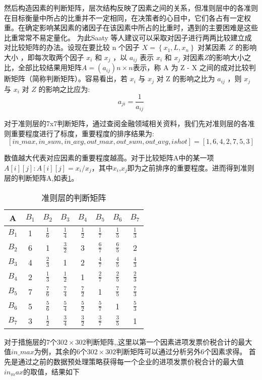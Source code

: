 \documentclass{cumcmthesis}
\begin{document}
然后构造因素的判断矩阵，层次结构反映了因素之间的关系，但准则层中的各准则在目标衡量中所占的比重并不一定相同，在决策者的心目中，它们各占有一定权重。在确定影响某因素的诸因子在该因素中所占的比重时，遇到的主要困难是这些比重常常不易定量化。 为此Saaty 等人建议可以采取对因子进行两两比较建立成对比较矩阵的办法。设现在要比较 n 个因子 $X = \left\{ x_1,L, x_n \right\} $ 对某因素 $Z$ 的影响大小 ，即每次取两个因子 $x_i$ 和 $x_j$ ，以 $a_{ij}$ 表示 $x_i$ 和 $x_j$ 对因素$Z$的影响大小之比，全部比较结果用矩阵$A = (a_{ij} )n \times n $表示，称 A 为 Z - X 之间的成对比较判断矩阵（简称判断矩阵）。容易看出，若 $x_i$ 与 $x_j$ 对 Z 的影响之比为 $a_{ij}$ ，则 $x_j$ 与 $x_i$ 对 $Z$ 的影响之比应为:
\begin{equation}
    a_{ji} = \frac{1}{a_{ij}}
\end{equation}

对于准则层的7x7判断矩阵，通过查阅金融领域相关资料，我们先对准则层的各准则重要程度进行了标度，重要程度的排序结果为:$$\left[ in\_max,in\_sum,in\_avg,out\_max,out\_sum,out\_avg,ishot\right]=[1,6,4,2,7,5,3]$$

数值越大代表对应因素的重要程度越高。对于比较矩阵A中的某一项$A\left[i\right]\left[j\right]:A\left[i\right]\left[j\right]=x_i/x_j$，其中$x_i$,$x_j$即为之前排序的重要程度。进而得到准则层的判断矩阵A,如表\ref{tablejudge}。

\begin{table}[H]
    \centering
    \begin{tabular}{|c|ccccccc|}%
    \hline
        A & $B_1$ & $B_2$ & $B_3$ & $B_4$ & $B_5$ & $B_6$ & $B_7$   \\
    \hline 
    $B_1$  &  1   &$\frac{1}{6}$  &$\frac{1}{4}$  &$\frac{1}{2}$  &$\frac{1}{7}$  &$\frac{1}{5}$  &$\frac{1}{3}$\\
    $B_2$  &  6   &1              &$\frac{3}{2}$  &3              &$\frac{6}{7}$  &$\frac{6}{5}$  &2\\
    $B_3$  &  4   &$\frac{2}{3}$  &1              &2              &$\frac{4}{7}$  &$\frac{4}{5}$  &$\frac{4}{3}$\\
    $B_4$  &  2   &$\frac{1}{3}$  &$\frac{1}{2}$  &1              &$\frac{2}{7}$  &$\frac{2}{5}$  &$\frac{2}{3}$\\
    $B_5$  &  7   &$\frac{7}{6}$  &$\frac{7}{4}$  &$\frac{7}{2}$  &1              &$\frac{7}{5}$  &$\frac{7}{3}$\\
    $B_6$  &  5   &$\frac{5}{6}$  &$\frac{5}{4}$  &$\frac{5}{2}$  &$\frac{5}{7}$  &1              &$\frac{5}{3}$\\
    $B_7$  &  3   &$\frac{1}{2}$  &$\frac{3}{4}$  &$\frac{3}{2}$  &$\frac{3}{7}$  &$\frac{3}{5}$  &1\\
    \hline
\end{tabular}
    \caption{准则层的判断矩阵}
    \label{tablejudge}
\end{table}
对于措施层的7个$302 \times 302$判断矩阵,,这里以第一个因素进项发票价税合计的最大值$in\_max$为例，其余的6个$302\times 302$判断矩阵可以通过分析另外6个因素求得。
首先是通过之前的数据预处理策略获得每一个企业的进项发票价税合计的最大值$in_max$的取值，结果如下
\end{document}
